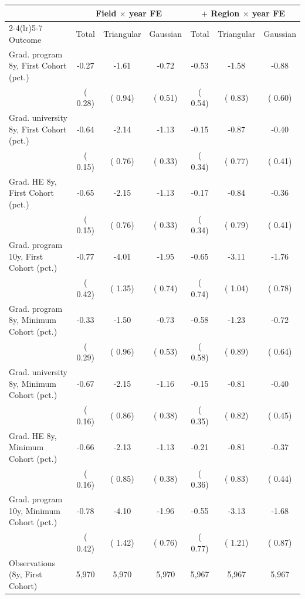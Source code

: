 \begin{tabular}{lcccccc}
\toprule
 & \multicolumn{3}{c}{Field \(\times\) year FE} & \multicolumn{3}{c}{\(+\) Region \(\times\) year FE} \\
\cmidrule(lr){2-4}\cmidrule(lr){5-7}
Outcome & Total & Triangular & Gaussian & Total & Triangular & Gaussian \\
\midrule
Grad. program 8y, First Cohort (pct.) &  -0.27 &  -1.61\sym{*} &  -0.72 &  -0.53 &  -1.58\sym{*} &  -0.88 \\
 & ( 0.28) & ( 0.94) & ( 0.51) & ( 0.54) & ( 0.83) & ( 0.60) \\
Grad. university 8y, First Cohort (pct.) &  -0.64\sym{***} &  -2.14\sym{***} &  -1.13\sym{***} &  -0.15 &  -0.87 &  -0.40 \\
 & ( 0.15) & ( 0.76) & ( 0.33) & ( 0.34) & ( 0.77) & ( 0.41) \\
Grad. HE 8y, First Cohort (pct.) &  -0.65\sym{***} &  -2.15\sym{***} &  -1.13\sym{***} &  -0.17 &  -0.84 &  -0.36 \\
 & ( 0.15) & ( 0.76) & ( 0.33) & ( 0.34) & ( 0.79) & ( 0.41) \\
Grad. program 10y, First Cohort (pct.) &  -0.77\sym{*} &  -4.01\sym{***} &  -1.95\sym{***} &  -0.65 &  -3.11\sym{***} &  -1.76\sym{**} \\
 & ( 0.42) & ( 1.35) & ( 0.74) & ( 0.74) & ( 1.04) & ( 0.78) \\
\addlinespace
Grad. program 8y, Minimum Cohort (pct.) &  -0.33 &  -1.50 &  -0.73 &  -0.58 &  -1.23 &  -0.72 \\
 & ( 0.29) & ( 0.96) & ( 0.53) & ( 0.58) & ( 0.89) & ( 0.64) \\
Grad. university 8y, Minimum Cohort (pct.) &  -0.67\sym{***} &  -2.15\sym{**} &  -1.16\sym{***} &  -0.15 &  -0.81 &  -0.40 \\
 & ( 0.16) & ( 0.86) & ( 0.38) & ( 0.35) & ( 0.82) & ( 0.45) \\
Grad. HE 8y, Minimum Cohort (pct.) &  -0.66\sym{***} &  -2.13\sym{**} &  -1.13\sym{***} &  -0.21 &  -0.81 &  -0.37 \\
 & ( 0.16) & ( 0.85) & ( 0.38) & ( 0.36) & ( 0.83) & ( 0.44) \\
Grad. program 10y, Minimum Cohort (pct.) &  -0.78\sym{*} &  -4.10\sym{***} &  -1.96\sym{**} &  -0.55 &  -3.13\sym{**} &  -1.68\sym{*} \\
 & ( 0.42) & ( 1.42) & ( 0.76) & ( 0.77) & ( 1.21) & ( 0.87) \\
\midrule
Observations (8y, First Cohort) &  5,970 &  5,970 &  5,970 &  5,967 &  5,967 &  5,967 \\
\bottomrule
\end{tabular}
